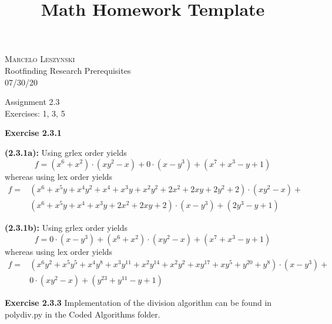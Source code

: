 \documentclass[12pt,oneside]{article}
\newenvironment{exercise}[1]{\vspace{.1in}\noindent\textbf{Exercise #1 \hspace{.05em}}}{}
\begin{document}
\title{Math Homework Template}

\begin{flushright}
\textsc{Marcelo Leszynski}  \\
Rootfinding Research Prerequisites\\
07/30/20
\end{flushright}

\begin{center}
\textsf{Assignment 2.3 } \\
\textsf{Exercises: 1, 3, 5 }
\end{center}


\begin{exercise}{2.3.1}

    \bigskip
    \textbf{(2.3.1a):}
    Using grlex order yields
    \[
        f=(x^6+x^2)\cdot(xy^2-x)+0\cdot(x-y^3)+(x^7+x^3-y+1)   
    \]
    whereas using lex order yields
    \begin{align*}
        f=&(x^6+x^5y+x^4y^2+x^4+x^3y+x^2y^2+2x^2+2xy+2y^2+2)\cdot(xy^2-x)+\\
        &(x^6+x^5y+x^4+x^3y+2x^2+2xy+2)\cdot(x-y^3)+(2y^3-y+1)   
    \end{align*}

    \bigskip
    \textbf{(2.3.1b):}
    Using grlex order yields
    \[
        f=0\cdot(x-y^3)+(x^6+x^2)\cdot(xy^2-x)+(x^7+x^3-y+1)    
    \]
    whereas using lex order yields
    \begin{align*}
        f=&(x^6y^2+x^5y^5+x^4y^8+x^3y^11+x^2y^14+x^2y^2+xy^17+xy^5+y^20+y^8)\cdot(x-y^3)+\\
        &0\cdot(xy^2-x)+(y^23+y^11-y+1)
    \end{align*}

\end{exercise}


\begin{exercise}{2.3.3}
    Implementation of the division algorithm can be found in poly\textunderscore div.py
    in the Coded Algorithms folder.
\end{exercise}

\end{document}
